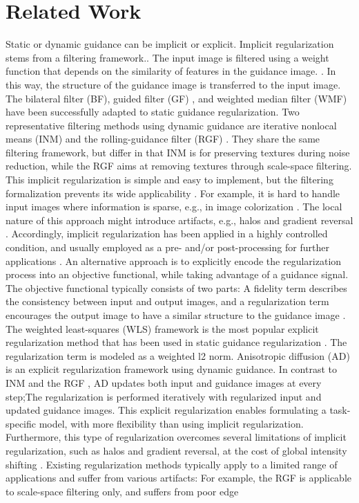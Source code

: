 \documentclass[10pt,twocolumn,letterpaper]{article}
\begin{document}
\section{Related Work}
Static or dynamic guidance can be implicit or explicit. Implicit regularization stems from a filtering framework.\cite{ham2015}. The input image is filtered using a weight function that depends on the similarity of features in the guidance image. \cite{Kopf:2007:JBU:1275808.1276497}. In this way, the structure of the guidance image is transferred to the input image. The bilateral filter (BF)\cite{tomasi1998bilateral}, guided filter (GF) \cite{he2013guided}, and weighted median filter (WMF) \cite{ma2013constant} have been successfully adapted to static guidance regularization. Two representative filtering methods using dynamic
guidance are iterative nonlocal means (INM)  \cite{brox2008efficient} and the rolling-guidance filter (RGF) \cite{ham2015robust}. They share the same filtering framework, but differ in that INM is for preserving textures during noise reduction, while the RGF aims at removing textures through scale-space filtering. This implicit regularization is simple and easy to implement, but the filtering formalization prevents its wide applicability \cite{ham2015}. For example, it is hard to handle input images where information is sparse, e.g., in image colorization \cite{levin2004colorization}. The local nature of this approach might introduce artifacts, e.g., halos and gradient reversal  \cite{he2013guided}. Accordingly, implicit regularization has been applied in a highly controlled condition, and usually employed as a pre- and/or post-processing for further applications \cite{lang2012practical,ma2013constant}. An alternative approach is to explicitly encode the regularization process into an objective functional, while taking advantage of a guidance signal. The objective functional typically consists of two parts: A fidelity term describes the consistency between input and output images, and a regularization term encourages the output image to have a similar structure to the guidance image \cite{ham2015}. The weighted least-squares (WLS) framework \cite{farbman2008edge} is the most popular explicit regularization method that has been used in static guidance regularization \cite{park2011high}. The regularization term is modeled as a weighted l2 norm. Anisotropic diffusion (AD) \cite{perona1990scale} is an explicit regularization framework using dynamic guidance. In contrast to INM \cite{brox2008efficient} and the RGF \cite{ham2015robust}, AD updates both input and guidance images at every step;The regularization is performed iteratively with regularized input and updated guidance images. This explicit regularization enables formulating a task-specific model, with more flexibility than using implicit regularization. Furthermore, this type of regularization overcomes several limitations of implicit regularization, such as halos and gradient reversal, at the cost of global intensity shifting \cite{farbman2008edge,he2013guided}. Existing regularization methods typically apply to a limited range of applications and suffer from various artifacts: For example, the RGF is applicable to scale-space filtering only, and suffers from poor edge 
\end{document}
